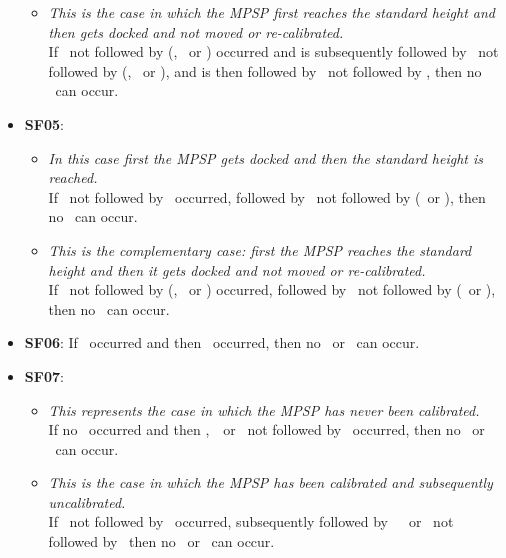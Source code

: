 \begin{itemize}
\begin{itemize}
        \item \textit{This is the case in which the MPSP first reaches the standard height and then gets docked and not moved or re-calibrated.}\\
        If \standardHeightReached\ not followed by (\resetStandardHeight, \motorUp\ or \motorDown) occurred and is subsequently followed by \dock\ not followed by (\undock, \motorUp\ or \motorDown), and  is then followed by \pressUp\ not followed by \releaseUp, then no \motorLeft\ can occur.
    \end{itemize}
    \item \textbf{SF05}:
    \begin{itemize}
        \item \textit{In this case first the MPSP gets docked and then the standard height is reached.}\\
        If \dock\ not followed by \undock\ occurred, followed by \standardHeightReached\ not followed by (\motorDown\ or \undock), then no \motorUp\ can occur.

        \item \textit{This is the complementary case: first the MPSP reaches the standard height and then it gets docked and not moved or re-calibrated.}\\
        If \standardHeightReached\ not followed by (\resetStandardHeight, \motorUp\ or \motorDown) occurred, followed by \dock\ not followed by (\motorDown\ or \undock), then no \motorUp\ can occur.
    \end{itemize}

    \item \textbf{SF06}: If \isDocked\ occurred and then \notRightmost\ occurred, then no \motorUp\ or \motorDown\ can occur.

    \item \textbf{SF07}:
    \begin{itemize}
        \item \textit{This represents the case in which the MPSP has never been calibrated.}\\
        If no \setStandardHeight\ occurred and then \tapDown,\tapUp\, \pressDown\ or \pressUp\ not followed by \setStandardHeight\ occurred, then no \motorLeft\ or \motorRight\ can occur.

        \item \textit{This is the case in which the MPSP has been calibrated and subsequently uncalibrated.}\\
        If \resetStandardHeight\ not followed by \setStandardHeight\ occurred, subsequently followed by \tapDown\,\tapUp\, \pressDown\ or \pressUp\ not followed by \setStandardHeight\, then no \motorLeft\ or \motorRight\ can occur.


\end{itemize}
\end{itemize}
